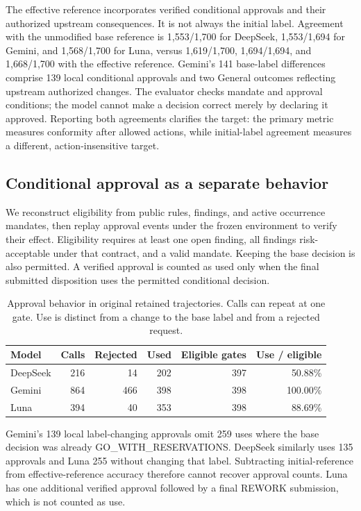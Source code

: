 The effective reference incorporates verified conditional approvals and their authorized
upstream consequences. It is not always the initial label. Agreement with the unmodified base
reference is 1,553/1,700 for DeepSeek, 1,553/1,694 for Gemini, and 1,568/1,700 for Luna, versus
1,619/1,700, 1,694/1,694, and 1,668/1,700 with the effective reference. Gemini's 141 base-label
differences comprise 139 local conditional approvals and two General outcomes reflecting
upstream authorized changes. The evaluator checks mandate and approval conditions; the model
cannot make a decision correct merely by declaring it approved. Reporting both agreements
clarifies the target: the primary metric measures conformity after allowed actions, while
initial-label agreement measures a different, action-insensitive target.

\subsection{Conditional approval as a separate behavior}

We reconstruct eligibility from public rules, findings, and active occurrence mandates, then
replay approval events under the frozen environment to verify their effect. Eligibility requires
at least one open finding, all findings risk-acceptable under that contract, and a valid mandate.
Keeping the base decision is also permitted. A verified approval is counted as used only when
the final submitted disposition uses the permitted conditional decision.

\begin{table}[!htb]
\centering\small
\caption{Approval behavior in original retained trajectories. Calls can repeat at one gate.
Use is distinct from a change to the base label and from a rejected request.}
\begin{tabular}{@{}lrrrrr@{}}
\toprule
Model & Calls & Rejected & Used & Eligible gates & Use / eligible\\
\midrule
DeepSeek & 216 & 14 & 202 & 397 & 50.88\%\\
Gemini & 864 & 466 & 398 & 398 & 100.00\%\\
Luna & 394 & 40 & 353 & 398 & 88.69\%\\
\bottomrule
\end{tabular}
\end{table}

Gemini's 139 local label-changing approvals omit 259 uses where the base decision was already
GO\_WITH\_RESERVATIONS. DeepSeek similarly uses 135 approvals and Luna 255 without changing
that label. Subtracting initial-reference from effective-reference accuracy therefore cannot
recover approval counts. Luna has one additional verified approval followed by a final REWORK
submission, which is not counted as use.

